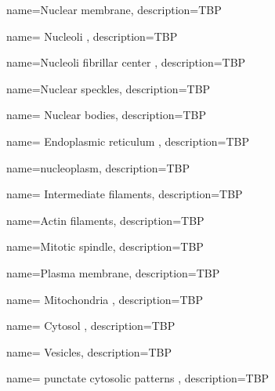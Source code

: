 \documentclass[]{article}
\begin{document}
{
	name=Nuclear membrane,
	description={TBP}
}

{
	name= Nucleoli ,
	description={TBP}
}

{
	name=Nucleoli fibrillar center ,
	description={TBP}
}

{
	name=Nuclear speckles,
	description={TBP}
}

{
	name= Nuclear bodies,
	description={TBP}
}

{
	name= Endoplasmic reticulum ,
	description={TBP}
}

{
	name=nucleoplasm,
	description={TBP}
}

{
	name= Intermediate filaments,
	description={TBP}
}

{
	name=Actin filaments,
	description={TBP}
}



{
	name=Mitotic spindle,
	description={TBP}
}



{
	name=Plasma membrane,
	description={TBP}
}

{
	name= Mitochondria ,
	description={TBP}
}


{
	name= Cytosol ,
	description={TBP}
}

{
	name= Vesicles,
	description={TBP}
}

{
	name= punctate cytosolic patterns ,
	description={TBP}
}



\clearpage

\glsaddall
\printglossary
\nocite{*}


\end{document}
